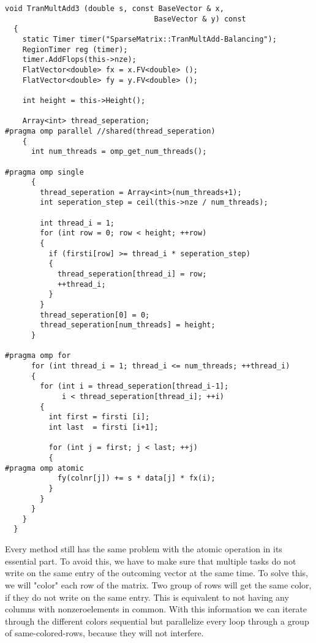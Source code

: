 \documentclass[a4paper,11pt]{scrartcl}
\begin{document}
\begin{lstlisting}
void TranMultAdd3 (double s, const BaseVector & x,
                                  BaseVector & y) const
  {
    static Timer timer("SparseMatrix::TranMultAdd-Balancing");
    RegionTimer reg (timer);
    timer.AddFlops(this->nze);
    FlatVector<double> fx = x.FV<double> ();
    FlatVector<double> fy = y.FV<double> ();

    int height = this->Height();

    Array<int> thread_seperation;
#pragma omp parallel //shared(thread_seperation)
    {
      int num_threads = omp_get_num_threads();

#pragma omp single
      {
        thread_seperation = Array<int>(num_threads+1);
        int seperation_step = ceil(this->nze / num_threads);

        int thread_i = 1;
        for (int row = 0; row < height; ++row)
        {
          if (firsti[row] >= thread_i * seperation_step)
          {
            thread_seperation[thread_i] = row;
            ++thread_i;
          }
        }
        thread_seperation[0] = 0;
        thread_seperation[num_threads] = height;
      }

#pragma omp for
      for (int thread_i = 1; thread_i <= num_threads; ++thread_i)
      {
        for (int i = thread_seperation[thread_i-1];
             i < thread_seperation[thread_i]; ++i)
        {
          int first = firsti [i];
          int last  = firsti [i+1];

          for (int j = first; j < last; ++j)
          {
#pragma omp atomic
            fy(colnr[j]) += s * data[j] * fx(i);
          }
        }
      }
    }
  }

\end{lstlisting}

Every method still has the same problem with the atomic operation in its
essential part. To avoid this, we have to make sure that multiple tasks do not
write on the same entry of the outcoming vector at the same time. To solve this,
 we will "color" each row of the matrix. Two group of rows will get the same
color, if they do not write on the same entry. This is equivalent to not having
any columns with nonzeroelements in common. With this information we can iterate through the different colors sequential but parallelize every loop through
 a group of same-colored-rows, because they will not interfere.
\end{document}
